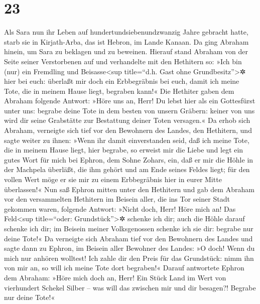 \hypertarget{section-22}{%
\section{23}\label{section-22}}

 Als Sara nun ihr Leben auf hundertundsiebenundzwanzig
Jahre gebracht hatte,  starb sie in Kirjath-Arba, das ist
Hebron, im Lande Kanaan. Da ging Abraham hinein, um Sara zu beklagen und
zu beweinen.  Hierauf stand Abraham von der Seite seiner
Verstorbenen auf und verhandelte mit den Hethitern so: 
»Ich bin (nur) ein Fremdling und Beisasse\textless sup title=``d.h. Gast
ohne Grundbesitz''\textgreater✲ hier bei euch: überlaßt mir doch ein
Erbbegräbnis bei euch, damit ich meine Tote, die in meinem Hause liegt,
begraben kann!«  Die Hethiter gaben dem Abraham folgende
Antwort:  »Höre uns an, Herr! Du lebst hier als ein
Gottesfürst unter uns: begrabe deine Tote in dem besten von unsern
Gräbern: keiner von uns wird dir seine Grabstätte zur Bestattung deiner
Toten versagen.«  Da erhob sich Abraham, verneigte sich
tief vor den Bewohnern des Landes, den Hethitern,  und
sagte weiter zu ihnen: »Wenn ihr damit einverstanden seid, daß ich meine
Tote, die in meinem Hause liegt, hier begrabe, so erweist mir die Liebe
und legt ein gutes Wort für mich bei Ephron, dem Sohne Zohars, ein,
 daß er mir die Höhle in der Machpela überläßt, die ihm
gehört und am Ende seines Feldes liegt; für den vollen Wert möge er sie
mir zu einem Erbbegräbnis hier in eurer Mitte überlassen!«
 Nun saß Ephron mitten unter den Hethitern und gab dem
Abraham vor den versammelten Hethitern im Beisein aller, die ins Tor
seiner Stadt gekommen waren, folgende Antwort:  »Nicht
doch, Herr! Höre mich an! Das Feld\textless sup title=``oder:
Grundstück''\textgreater✲ schenke ich dir; auch die Höhle darauf schenke
ich dir; im Beisein meiner Volksgenossen schenke ich sie dir: begrabe
nur deine Tote!«  Da verneigte sich Abraham tief vor den
Bewohnern des Landes  und sagte dann zu Ephron, im
Beisein aller Bewohner des Landes: »O doch! Wenn du mich nur anhören
wolltest! Ich zahle dir den Preis für das Grundstück: nimm ihn von mir
an, so will ich meine Tote dort begraben!«  Darauf
antwortete Ephron dem Abraham:  »Höre mich doch an, Herr!
Ein Stück Land im Wert von vierhundert Schekel Silber -- was will das
zwischen mir und dir besagen?! Begrabe nur deine Tote!« 
